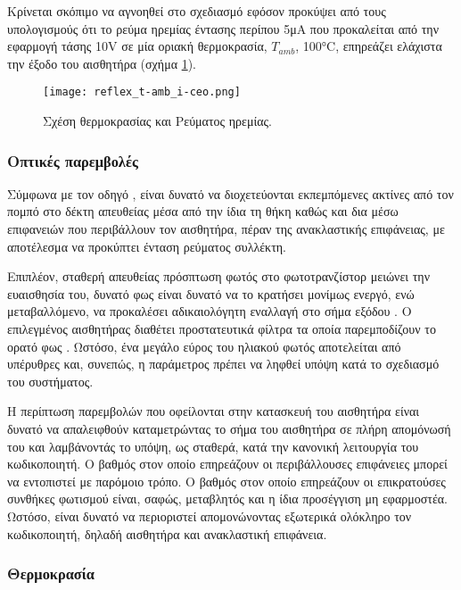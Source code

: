 Κρίνεται σκόπιμο να αγνοηθεί στο σχεδιασμό εφόσον προκύψει από τους υπολογισμούς
ότι το ρεύμα ηρεμίας έντασης περίπου 5μA που προκαλείται από την εφαρμογή
τάσης 10V σε μία οριακή θερμοκρασία, $T_{amb}$, 100°C, επηρεάζει ελάχιστα την
έξοδο του αισθητήρα (σχήμα \ref{fig:reflex:t-amb_i-ceo}).

\begin{figure}
    \caption{Σχέση θερμοκρασίας και Ρεύματος ηρεμίας.
    \label{fig:reflex:t-amb_i-ceo}}
    \begin{center}%
    \texttt{[image: reflex\_t-amb\_i-ceo.png]}
    \end{center}

\end{figure}

\subsubsection{Οπτικές παρεμβολές}

Σύμφωνα με τον οδηγό \textcite{vishay06}, είναι δυνατό να διοχετεύονται
εκπεμπόμενες ακτίνες από τον πομπό στο δέκτη απευθείας μέσα από την ίδια τη θήκη
καθώς και δια μέσω επιφανειών που περιβάλλουν τον αισθητήρα, πέραν της
ανακλαστικής επιφάνειας, με αποτέλεσμα να προκύπτει ένταση ρεύματος συλλέκτη.

Επιπλέον, σταθερή απευθείας πρόσπτωση φωτός στο φωτοτρανζίστορ μειώνει την
ευαισθησία του, δυνατό φως είναι δυνατό να το κρατήσει μονίμως ενεργό, ενώ
μεταβαλλόμενο, να προκαλέσει αδικαιολόγητη εναλλαγή στο σήμα εξόδου
\parencite{vishay06}.
Ο επιλεγμένος αισθητήρας διαθέτει προστατευτικά φίλτρα τα οποία παρεμποδίζουν το
ορατό φως \parencite{vishay09}. Ωστόσο, ένα μεγάλο εύρος του ηλιακού φωτός
αποτελείται από υπέρυθρες και, συνεπώς, η παράμετρος πρέπει να ληφθεί υπόψη κατά
το σχεδιασμό του συστήματος.

Η περίπτωση παρεμβολών που οφείλονται στην κατασκευή του αισθητήρα είναι δυνατό
να απαλειφθούν καταμετρώντας το σήμα του αισθητήρα σε πλήρη απομόνωσή του και
λαμβάνοντάς το υπόψη, ως σταθερά, κατά την κανονική λειτουργία του κωδικοποιητή.
Ο βαθμός στον οποίο επηρεάζουν οι περιβάλλουσες επιφάνειες μπορεί να εντοπιστεί
με παρόμοιο τρόπο. Ο βαθμός στον οποίο επηρεάζουν οι επικρατούσες συνθήκες
φωτισμού είναι, σαφώς, μεταβλητός και η ίδια προσέγγιση μη εφαρμοστέα. Ωστόσο,
είναι δυνατό να περιοριστεί απομονώνοντας εξωτερικά ολόκληρο τον κωδικοποιητή,
δηλαδή αισθητήρα και ανακλαστική επιφάνεια.

\subsubsection{Θερμοκρασία}

